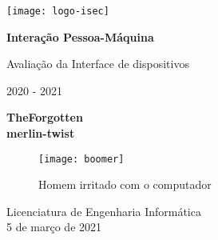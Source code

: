 \begin{titlepage}
	\begin{center}
		\texttt{[image: logo-isec]}
		
		\vspace*{\fill}
		
		\Huge
		\textbf{Interação Pessoa-Máquina}
		
		\huge
		Avaliação da Interface de dispositivos
		
		\vspace{0.5cm}
		\LARGE
		2020 - 2021
		
		\vspace{1.5cm}
		
		\textbf{TheForgotten\\merlin-twist}
		
		\begin{figure}[h]
			\texttt{[image: boomer]}
			\centering
			\caption{Homem irritado com o computador}
			\label{fig:angry-man}
		\end{figure}
		
		\vfill
		\vspace*{\fill}
		
		\normalsize
		Licenciatura de Engenharia Informática \\
		5 de março de 2021		
	\end{center}
\end{titlepage}
